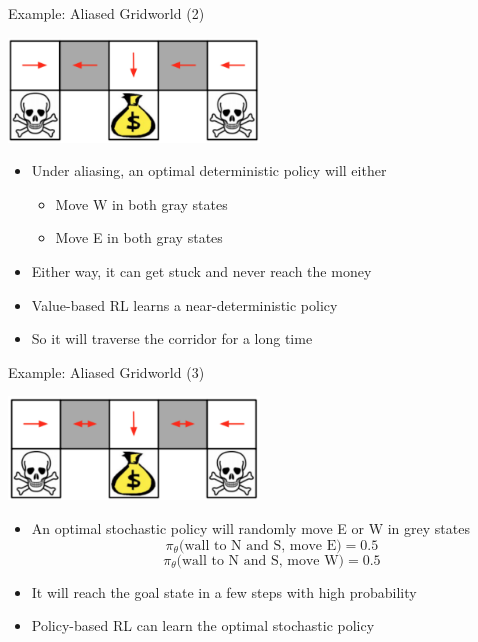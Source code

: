 \begin{frame}[c]{Example: Aliased Gridworld (2)}
	
	\begin{center}
		\includegraphics[width=0.5\textwidth]{images/gridworld2.png}
	\end{center}
	
	\begin{itemize}
		\item Under aliasing, an optimal \alert{deterministic} policy will either
		\begin{itemize}
			\item Move W in both gray states 
			\item Move E in both gray states
		\end{itemize}
		\item Either way, it can get stuck and never reach the money
		\item Value-based RL learns a near-deterministic policy
		\item So it will traverse the corridor for a long time
	\end{itemize}

\end{frame}
\begin{frame}[c]{Example: Aliased Gridworld (3)}
	
	\begin{center}
		\includegraphics[width=0.5\textwidth]{images/gridworld3.png}
	\end{center}
	
	\begin{itemize}
		\item An optimal \alert{stochastic} policy will randomly move E or W in grey states
		$$\pi_\theta\text{(wall to N and S, move E)} = 0.5 $$
		$$\pi_\theta\text{(wall to N and S, move W)} = 0.5 $$
		\item It will reach the goal state in a few steps with high probability
		\item Policy-based RL can learn the optimal stochastic policy
	\end{itemize}
	
\end{frame}
